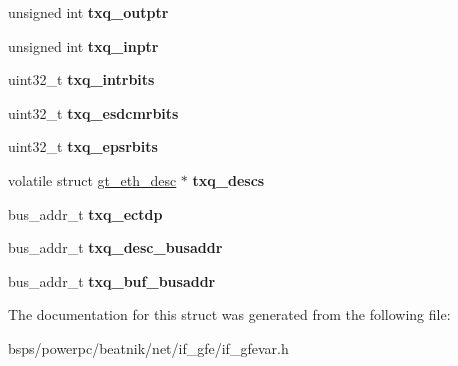 \begin{DoxyCompactItemize}
unsigned int {\bfseries txq\+\_\+outptr}
\item 
\mbox{\label{structgfe__txqueue_a6963680138112ac93fae7dc61cf736ca}} 
unsigned int {\bfseries txq\+\_\+inptr}
\item 
\mbox{\label{structgfe__txqueue_a3255dc9702faf91b719819e7a4550012}} 
uint32\+\_\+t {\bfseries txq\+\_\+intrbits}
\item 
\mbox{\label{structgfe__txqueue_ae1619b346cb1175b19514a90dd590f94}} 
uint32\+\_\+t {\bfseries txq\+\_\+esdcmrbits}
\item 
\mbox{\label{structgfe__txqueue_ab368266de5795715e2463251a91d51f7}} 
uint32\+\_\+t {\bfseries txq\+\_\+epsrbits}
\item 
\mbox{\label{structgfe__txqueue_acfb5355830142e8d3efed59ce9e32ae8}} 
volatile struct \mbox{\hyperlink{structgt__eth__desc}{gt\+\_\+eth\+\_\+desc}} $\ast$ {\bfseries txq\+\_\+descs}
\item 
\mbox{\label{structgfe__txqueue_add6663169970403b348956d39449f8e8}} 
bus\+\_\+addr\+\_\+t {\bfseries txq\+\_\+ectdp}
\item 
\mbox{\label{structgfe__txqueue_ae5dbcef3b3f8a766e058db30be5a6279}} 
bus\+\_\+addr\+\_\+t {\bfseries txq\+\_\+desc\+\_\+busaddr}
\item 
\mbox{\label{structgfe__txqueue_a886246b272048b5892c5794fc4231487}} 
bus\+\_\+addr\+\_\+t {\bfseries txq\+\_\+buf\+\_\+busaddr}
\end{DoxyCompactItemize}


The documentation for this struct was generated from the following file\+:\begin{DoxyCompactItemize}
\item 
bsps/powerpc/beatnik/net/if\+\_\+gfe/if\+\_\+gfevar.\+h\end{DoxyCompactItemize}

